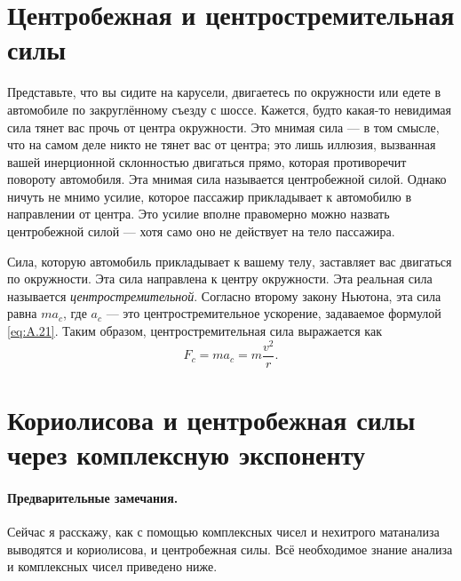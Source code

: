 \section{Центробежная и центростремительная силы}

Представьте, что вы сидите на карусели, двигаетесь по окружности или едете в автомобиле по закруглённому съезду с шоссе.
Кажется, будто какая-то невидимая сила тянет вас прочь от центра окружности.
Это мнимая сила — в том смысле, что на самом деле никто не тянет вас от центра; это лишь иллюзия, вызванная вашей инерционной склонностью двигаться прямо, которая противоречит повороту автомобиля.
Эта мнимая сила называется центробежной силой.
Однако ничуть не мнимо усилие, которое пассажир прикладывает к автомобилю в направлении от центра.
Это усилие вполне правомерно можно назвать центробежной силой — хотя само оно не действует на тело пассажира.

Сила, которую автомобиль прикладывает к вашему телу, заставляет вас двигаться по окружности.
Эта сила направлена к центру окружности.
Эта реальная сила называется \emph{центростремительной}.
Согласно второму закону Ньютона, эта сила равна $ma_{c}$, где $a_{c}$ — это центростремительное ускорение, задаваемое формулой \eqref{eq:A.21}.
Таким образом, центростремительная сила выражается как
\[F_{c} = ma_{c} = m\frac{v^{2}}{r}.\]

\section{Кориолисова и центробежная силы через комплексную экспоненту}

\paragraph{Предварительные замечания.}
Сейчас я расскажу, как с помощью комплексных чисел и нехитрого матанализа выводятся и кориолисова, и центробежная силы.
Всё необходимое знание анализа и комплексных чисел приведено ниже.

